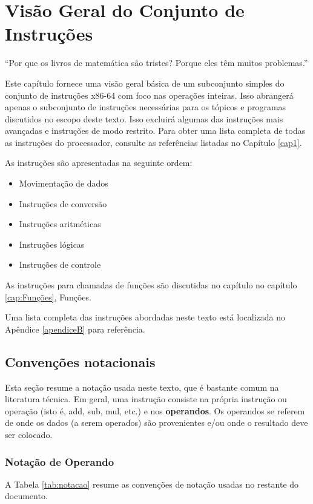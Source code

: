 \chapter{Visão Geral do Conjunto de Instruções}

\begin{chapquote}{}
``Por que os livros de matemática são tristes?
Porque eles têm muitos problemas.''
\end{chapquote}

Este capítulo fornece uma visão geral básica de um subconjunto simples do conjunto de instruções x86-64 com foco nas operações inteiras. Isso abrangerá apenas o subconjunto de instruções necessárias para os tópicos e programas discutidos no escopo deste texto. Isso excluirá algumas das instruções mais avançadas e instruções de modo restrito. Para obter uma lista completa de todas as instruções do processador, consulte as referências listadas no Capítulo \ref{cap1}.

As instruções são apresentadas na seguinte ordem:
\begin{itemize}
	\item Movimentação de dados
	\item Instruções de conversão
	\item Instruções aritméticas
	\item Instruções lógicas
	\item Instruções de controle
\end{itemize}

As instruções para chamadas de funções são discutidas no capítulo no capítulo \ref{cap:Funções}, Funções.

Uma lista completa das instruções abordadas neste texto está localizada no Apêndice \ref{apendiceB} para referência.

\section{Convenções notacionais}
Esta seção resume a notação usada neste texto, que é bastante comum na literatura técnica. Em geral, uma instrução consiste na própria instrução ou operação (isto é, add, sub, mul, etc.) e nos \textbf{operandos}. Os operandos se referem de onde os dados (a serem operados) são provenientes e/ou onde o resultado deve ser colocado.

\subsection{Notação de Operando}
A Tabela \ref{tab:notacao} resume as convenções de notação usadas no restante do documento.

